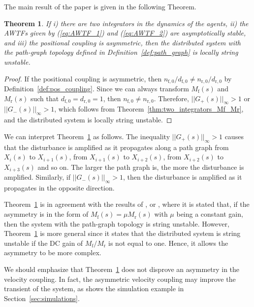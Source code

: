 \documentclass[10pt,twocolumn,twoside]{IEEEtran}
\newtheorem{theorem}{Theorem}
\theoremstyle{definition}
\newcommand{\revA}{Black}
\begin{document}
The main result of the paper is given in the following Theorem.





\begin{theorem}\label{thm:sym_coupl}
If i) there are two integrators in the dynamics of the agents, ii) the AWTFs given by (\ref{eq:AWTF_1}) and (\ref{eq:AWTF_2}) are asymptotically stable, and iii) the positional coupling is asymmetric, then the distributed system {\color{\revA}with the path-graph topology defined in Definition~\ref{def:path_graph}} is locally string unstable.
\end{theorem}
\begin{proof}
If the positional coupling is asymmetric, then $n_{\text{f},0}/d_{\text{f},0} \neq n_{\text{r},0}/d_{\text{r},0}$ by Definition~\ref{def:pos_coupling}. Since we can always transform $M_{\text{f}}(s)$ and $M_{\text{r}}(s)$ such that $d_{\text{f},0} = d_{\text{r},0}=1$, then $n_{\text{f},0} \neq n_{\text{r},0}$. Therefore, $||G_{+}(s)||_{\infty} > 1$ or $||G_{-}(s)||_{\infty} > 1$, which follows from Theorem~\ref{thm:two_integrators_Mf_Mr}, and the distributed system is locally string unstable.

\end{proof}

We can interpret Theorem~\ref{thm:sym_coupl} as follows. The inequality $||G_{+}(s)||_{\infty} > 1$ causes that the disturbance is amplified as it propagates {\color{\revA}along a path graph} from $X_{i}(s)$ to $X_{i+1}(s)$, from $X_{i+1}(s)$ to $X_{i+2}(s)$, from $X_{i+2}(s)$ to $X_{i+3}(s)$ and so on. The larger the path graph is, the more the disturbance is amplified. Similarly, if $||G_{-}(s)||_{\infty} > 1$, then the disturbance is amplified as it propagates in the opposite direction.





Theorem~\ref{thm:sym_coupl} is in agreement with the results of \cite{Barooah2009}, \cite{Tangerman2012} or \cite{Herman2014c}, where it is stated that, if the asymmetry is in the form of $M_{\text{f}}(s) = \mu M_{\text{r}}(s)$ with $\mu$ being a constant gain, then the system with the path-graph topology is string unstable. However, Theorem~\ref{thm:sym_coupl} is more general since it states that the distributed system is string unstable if the DC gain of $M_{\text{f}}/M_{\text{r}}$ is not equal to one. Hence, it allows the asymmetry to be more complex.

We should emphasize that Theorem~\ref{thm:sym_coupl} does not disprove an asymmetry in the velocity coupling. In fact, the asymmetric velocity coupling may improve the transient of the system, as shows the simulation example in Section~\ref{sec:simulations}.
\end{document}
